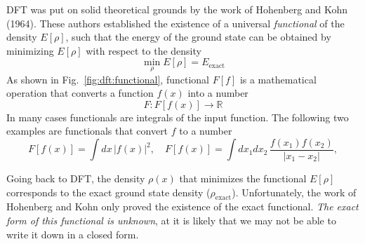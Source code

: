 \documentclass[../Main/chem371-notes.tex]{subfiles}
\begin{document}
DFT was put on solid theoretical grounds by the work of Hohenberg and Kohn (1964).
These authors established the existence of a universal \emph{functional} of the density $E[\rho]$, such that the energy of the ground state can be obtained by minimizing $E[\rho]$ with respect to the density
\begin{equation}
\min_\rho E[\rho] = E_\mathrm{exact}
\end{equation}
As shown in Fig.~\ref{fig:dft:functional}, functional $F[f]$ is a mathematical operation that converts a function $f(x)$ into a number
\begin{equation}
F : F[f(x)] \rightarrow \mathbb{R}
\end{equation}
In many cases functionals are integrals of the input function.
The following two examples are functionals that convert $f$ to a number
\begin{equation}
F[f(x)] = \int dx \, |f(x)|^2,\quad F[f(x)] = \int dx_1 dx_2 \, \frac{f(x_1) f(x_2)}{|x_1 - x_2|},
\end{equation}

Going back to DFT, the density $\rho(x)$ that minimizes the functional $E[\rho]$ corresponds to the exact ground state density ($\rho_\mathrm{exact}$).
Unfortunately, the work of Hohenberg and Kohn only proved the existence of the exact functional.
\emph{The exact form of this functional is unknown}, at it is likely that we may not be able to write it down in a closed form.
\end{document}
